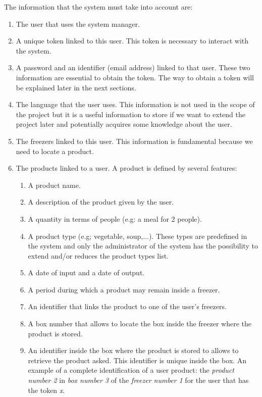 The information that the system must take into account are:
\begin{enumerate}
\item The user that uses the system manager.
\item A unique token linked to this user. This token is necessary to interact with the system.
\item A password and an identifier (email address) linked to that user. These two information are essential to obtain the token. The way to obtain a token will be explained later in the next sections.
\item The language that the user uses. This information is not used in the scope of the project but it is a useful information to store if we want to extend the project later and potentially acquires some knowledge about the user.
\item The freezers linked to this user. This information is fundamental because we need to locate a product.
\item The products linked to a user. A product is defined by several features: 
\begin{enumerate}
\item A product name.
\item A description of the product given by the user.
\item A quantity in terms of people (e.g: a meal for 2 people).
\item A product type (e.g; vegetable, soup,...). These types are predefined in the system and only the administrator of the system has the possibility to extend and/or reduces the product types list.
\item A date of input and a date of output.
\item A period during which a product may remain inside a freezer.
\item An identifier that links the product to one of the user's freezers.
\item A box number that allows to locate the box inside the freezer where the  product is stored.
\item An identifier inside the box where the product is stored to allows to retrieve the product asked. This identifier is unique inside the box. An example of a complete identification of a user product: the \textit{product number 2} in \textit{box number 3} of the \textit{freezer number 1} for the user that has the token \textit{x}.
\end{enumerate}
\end{enumerate}

